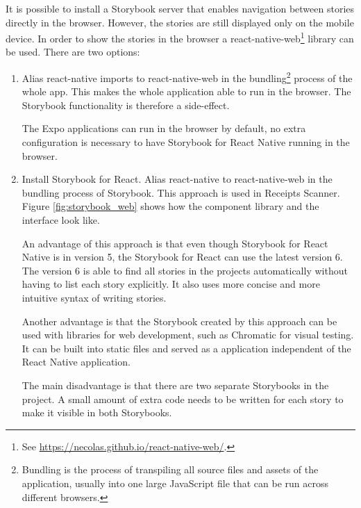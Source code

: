 \documentclass[
  digital, %
  table,   %
  oneside, %
  lof,     %
  lot,     %
]{fithesis3}
\begin{document}
It is possible to install a Storybook server that enables navigation between stories directly in the browser. However, the stories are still displayed only on the mobile device. In order to show the stories in the browser a react-native-web\footnote{See \url{https://necolas.github.io/react-native-web/}.} library can be used. There are two options:
\begin{enumerate}
    \item Alias react-native imports to react-native-web in the bundling\footnote{Bundling is the process of transpiling all source files and assets of the application, usually into one large JavaScript file that can be run across different browsers.} process of the whole app. This makes the whole application able to run in the browser. The Storybook functionality is therefore a side-effect.
    
    The Expo applications can run in the browser by default, no extra configuration is necessary to have Storybook for React Native running in the browser.
    
    \item Install Storybook for React. Alias react-native to react-native-web in the bundling process of Storybook. This approach is used in Receipts Scanner. Figure \ref{fig:storybook_web} shows how the component library and the interface look like.
    
    An advantage of this approach is that even though Storybook for React Native is in version 5, the Storybook for React can use the latest version 6. The version 6 is able to find all stories in the projects automatically without having to list each story explicitly. It also uses more concise and more intuitive syntax of writing stories.
    
    Another advantage is that the Storybook created by this approach can be used with libraries for web development, such as Chromatic for visual testing. It can be built into static files and served as a application independent of the React Native application.
    
    The main disadvantage is that there are two separate Storybooks in the project. A small amount of extra code needs to be written for each story to make it visible in both Storybooks. 
    
\end{enumerate}
\end{document}
